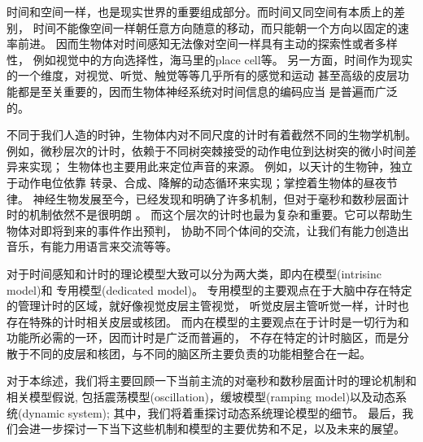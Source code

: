 
时间和空间一样，也是现实世界的重要组成部分。而时间又同空间有本质上的差别，
时间不能像空间一样朝任意方向随意的移动，而只能朝一个方向以固定的速率前进。
因而生物体对时间感知无法像对空间一样具有主动的探索性或者多样性，
例如视觉中的方向选择性，海马里的place cell等。
另一方面，时间作为现实的一个维度，对视觉、听觉、触觉等等几乎所有的感觉和运动
甚至高级的皮层功能都是至关重要的，因而生物体神经系统对时间信息的编码应当
是普遍而广泛的。

不同于我们人造的时钟，生物体内对不同尺度的计时有着截然不同的生物学机制。
例如，微秒层次的计时，依赖于不同树突棘接受的动作电位到达树突的微小时间差异来实现；
生物体也主要用此来定位声音的来源。
例如，以天计的生物钟，独立于动作电位依靠
转录、合成、降解的动态循环来实现；掌控着生物体的昼夜节律。
神经生物发展至今，已经发现和明确了许多机制，但对于毫秒和数秒层面计时的机制依然不是很明朗
。
而这个层次的计时也最为复杂和重要。它可以帮助生物体对即将到来的事件作出预判，
协助不同个体间的交流，让我们有能力创造出音乐，有能力用语言来交流等等。

对于时间感知和计时的理论模型大致可以分为两大类，即内在模型(intrisinc model)和
专用模型(dedicated model)。
专用模型的主要观点在于大脑中存在特定的管理计时的区域，就好像视觉皮层主管视觉，
听觉皮层主管听觉一样，计时也存在特殊的计时相关皮层或核团。
而内在模型的主要观点在于计时是一切行为和功能所必需的一环，因而计时是广泛而普遍的，
不存在特定的计时脑区，而是分散于不同的皮层和核团，与不同的脑区所主要负责的功能相整合在一起。


对于本综述，我们将主要回顾一下当前主流的对毫秒和数秒层面计时的理论机制和相关模型假说,
包括震荡模型(oscillation)，缓坡模型(ramping model)以及动态系统(dynamic system);
其中，我们将着重探讨动态系统理论模型的细节。
最后，我们会进一步探讨一下当下这些机制和模型的主要优势和不足，以及未来的展望。
